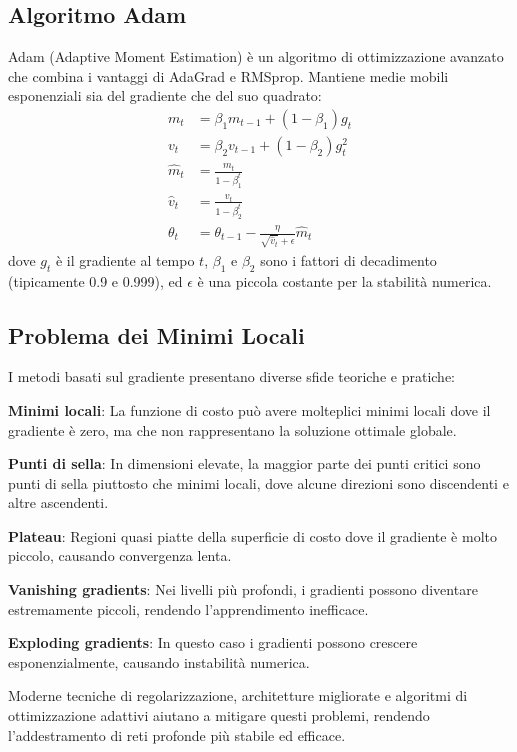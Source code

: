 \subsection{Algoritmo Adam}
Adam (Adaptive Moment Estimation) è un algoritmo di ottimizzazione avanzato che combina i vantaggi di AdaGrad e RMSprop. Mantiene medie mobili esponenziali sia del gradiente che del suo quadrato:
\begin{align}
m_t &= \beta_1 m_{t-1} + (1 - \beta_1) g_t \\
v_t &= \beta_2 v_{t-1} + (1 - \beta_2) g_t^2 \\
\hat{m}_t &= \frac{m_t}{1 - \beta_1^t} \\
\hat{v}_t &= \frac{v_t}{1 - \beta_2^t} \\
\theta_t &= \theta_{t-1} - \frac{\eta}{\sqrt{\hat{v}_t} + \epsilon} \hat{m}_t
\end{align}
dove $g_t$ è il gradiente al tempo $t$, $\beta_1$ e $\beta_2$ sono i fattori di decadimento (tipicamente 0.9 e 0.999), ed $\epsilon$ è una piccola costante per la stabilità numerica.

\subsection{Problema dei Minimi Locali}
I metodi basati sul gradiente presentano diverse sfide teoriche e pratiche:

\begin{compactitemize}
\item \textbf{Minimi locali}: La funzione di costo può avere molteplici minimi locali dove il gradiente è zero, ma che non rappresentano la soluzione ottimale globale.
\item \textbf{Punti di sella}: In dimensioni elevate, la maggior parte dei punti critici sono punti di sella piuttosto che minimi locali, dove alcune direzioni sono discendenti e altre ascendenti.
\item \textbf{Plateau}: Regioni quasi piatte della superficie di costo dove il gradiente è molto piccolo, causando convergenza lenta.
\item \textbf{Vanishing gradients}: Nei livelli più profondi, i gradienti possono diventare estremamente piccoli, rendendo l'apprendimento inefficace.
\item \textbf{Exploding gradients}: In questo caso i gradienti possono crescere esponenzialmente, causando instabilità numerica.
\end{compactitemize}
Moderne tecniche di regolarizzazione, architetture migliorate e algoritmi di ottimizzazione adattivi aiutano a mitigare questi problemi, rendendo l'addestramento di reti profonde più stabile ed efficace.


